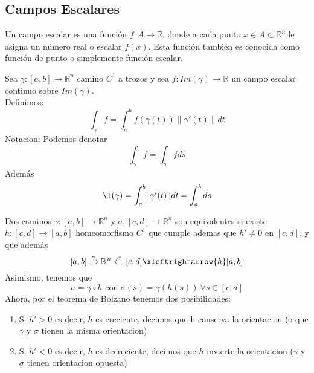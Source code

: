 \subsection{Campos Escalares}

\begin{definición} 
Un campo escalar es una función $f: A \to \mathbb{R}$, donde a cada punto $x \in A \subset \mathbb{R}^n$ le asigna un número real o escalar $f(x)$. Esta función también es conocida como función de punto o simplemente función escalar.
\end{definición}

\begin{definición} 
Sea $\gamma : [a,b] \to \mathbb{R}^n$ camino $C^1$ a trozos y sea $f:Im(\gamma) \to \mathbb{R}$ un campo escalar continuo sobre $Im(\gamma)$.\\
Definimos:
$$ \int_{\gamma} f = \int_{a}^{b} f(\gamma(t)) \lVert \gamma'(t) \rVert dt$$
Notacion: Podemos denotar $$\int_{\gamma} f = \int_{\gamma} f ds$$
Además
$$\l(\gamma) = \int_{a}^{b} \lVert \gamma'(t) \rVert dt = \int_{a}^{b} ds$$
\end{definición}

\begin{definición} 
Dos caminos $\gamma: [a,b] \to \mathbb{R}^n$ y $\sigma:[c,d] \to \mathbb{R}^n$ son equivalentes si existe $h:[c,d] \to [a,b]$ homeomorfismo $C^1$ que cumple ademas que $h' \neq 0$ en $[c,d]$, y que además
$$[a,b] \xrightarrow{\gamma} \mathbb{R}^n \xleftarrow{\sigma}[c,d] \xleftrightarrow{h} [a,b]$$
Asimismo, tenemos que
$$\sigma = \gamma \circ h \text{ con } \sigma(s) = \gamma(h(s)) \ \forall s \in [c,d]$$
Ahora, por el teorema de Bolzano tenemos dos posibilidades:
\begin{enumerate}
    \item Si $h'>0$ es decir, $h$ es creciente, decimos que h conserva la orientacion (o
          que $\gamma$ y $\sigma$ tienen la misma orientacion)
    \item Si $h'<0$ es decir, $h$ es decreciente, decimos que $h$ invierte la orientacion
          ($\gamma$ y $\sigma$ tienen orientacion opuesta)
\end{enumerate}
\end{definición}

